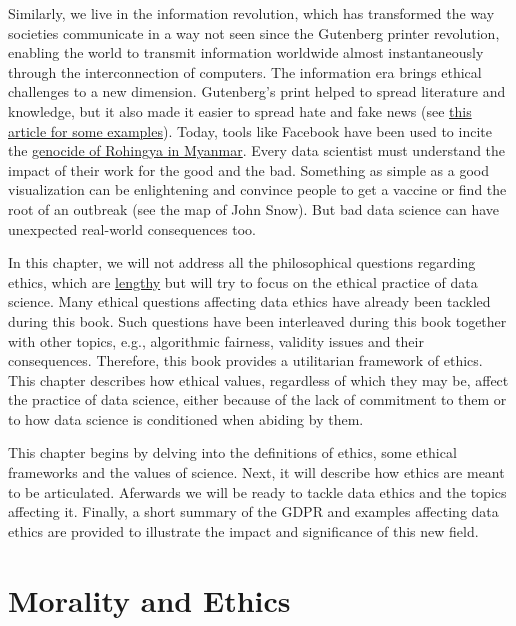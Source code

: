 \documentclass[
]{book}
\begin{document}
Similarly, we live in the information revolution, which has transformed the way societies communicate in a way not seen since the Gutenberg printer revolution, enabling the world to transmit information worldwide almost instantaneously through the interconnection of computers. The information era brings ethical challenges to a new dimension. Gutenberg's print helped to spread literature and knowledge, but it also made it easier to spread hate and fake news (see \href{https://www.politico.com/magazine/story/2016/12/fake-news-history-long-violent-214535/}{this article for some examples}). Today, tools like Facebook have been used to incite the \href{https://www.nytimes.com/2018/10/15/technology/myanmar-facebook-genocide.html}{genocide of Rohingya in Myanmar}. Every data scientist must understand the impact of their work for the good and the bad. Something as simple as a good visualization can be enlightening and convince people to get a vaccine or find the root of an outbreak (see the map of John Snow). But bad data science can have unexpected real-world consequences too.

In this chapter, we will not address all the philosophical questions regarding ethics, which are \href{https://en.wikipedia.org/wiki/Ethics}{lengthy} but will try to focus on the ethical practice of data science. Many ethical questions affecting data ethics have already been tackled during this book. Such questions have been interleaved during this book together with other topics, e.g., algorithmic fairness, validity issues and their consequences. Therefore, this book provides a utilitarian framework of ethics. This chapter describes how ethical values, regardless of which they may be, affect the practice of data science, either because of the lack of commitment to them or to how data science is conditioned when abiding by them.

This chapter begins by delving into the definitions of ethics, some ethical frameworks and the values of science. Next, it will describe how ethics are meant to be articulated. Aferwards we will be ready to tackle data ethics and the topics affecting it. Finally, a short summary of the GDPR and examples affecting data ethics are provided to illustrate the impact and significance of this new field.

\hypertarget{morality-and-ethics}{%
\section{Morality and Ethics}\label{morality-and-ethics}}
\end{document}
